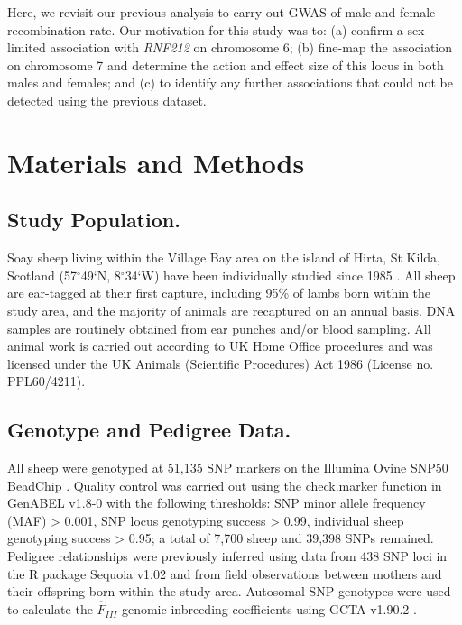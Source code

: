 \documentclass[a4paper,11pt]{article}
\begin{document}
Here, we revisit our previous analysis to carry out GWAS of male and female recombination rate. Our motivation for this study was to: (a) confirm a sex-limited association with \textit{RNF212} on chromosome 6; (b) fine-map the association on chromosome 7 and determine the action and effect size of this locus in both males and females; and (c) to identify any further associations that could not be detected using the previous dataset.




\section*{Materials and Methods}

\subsection*{Study Population.}

Soay sheep living within the Village Bay area on the island of Hirta, St Kilda, Scotland (57$^{\circ}$49`N, 8$^{\circ}$34`W) have been individually studied since 1985 \citep{CluttonBrock2004}. All sheep are ear-tagged at their first capture, including 95\% of lambs born within the study area, and the majority of animals are recaptured on an annual basis. DNA samples are routinely obtained from ear punches and/or blood sampling. All animal work is carried out according to UK Home Office procedures and was licensed under the UK Animals (Scientific Procedures) Act 1986 (License no. PPL60/4211). 

\subsection*{Genotype and Pedigree Data.}

All sheep were genotyped at 51,135 SNP markers on the Illumina Ovine SNP50 BeadChip \citep{Kijas2009}. Quality control was carried out using the check.marker function in GenABEL v1.8-0 with the following thresholds: SNP minor allele frequency (MAF) > 0.001, SNP locus genotyping success > 0.99, individual sheep genotyping success > 0.95; a total of 7,700 sheep and 39,398 SNPs remained. Pedigree relationships were previously inferred using data from 438 SNP loci in the R package Sequoia v1.02 \citep{Huisman2017} and from field observations between mothers and their offspring born within the study area. Autosomal SNP genotypes were used to calculate the $\hat{F}_{III}$ genomic inbreeding coefficients using GCTA v1.90.2 \citep{Yang2011}.
\end{document}
